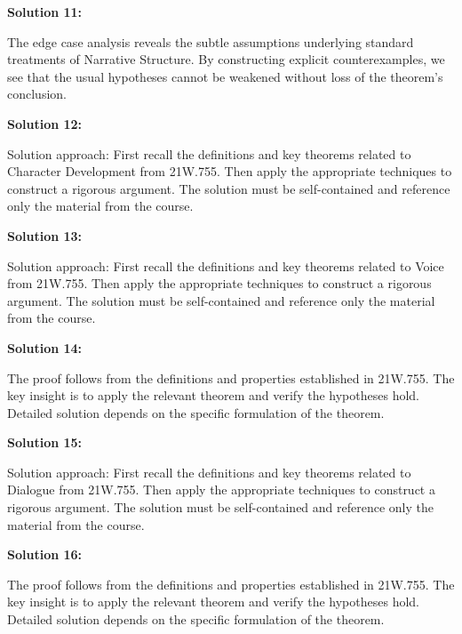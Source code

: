 \documentclass[12pt,a4paper]{exam}
\begin{document}
\textbf{Solution 11:}

The edge case analysis reveals the subtle assumptions underlying standard treatments of Narrative Structure. By constructing explicit counterexamples, we see that the usual hypotheses cannot be weakened without loss of the theorem's conclusion.

\vspace{0.5cm}

\textbf{Solution 12:}

Solution approach: First recall the definitions and key theorems related to Character Development from 21W.755. Then apply the appropriate techniques to construct a rigorous argument. The solution must be self-contained and reference only the material from the course.

\vspace{0.5cm}

\textbf{Solution 13:}

Solution approach: First recall the definitions and key theorems related to Voice from 21W.755. Then apply the appropriate techniques to construct a rigorous argument. The solution must be self-contained and reference only the material from the course.

\vspace{0.5cm}

\textbf{Solution 14:}

The proof follows from the definitions and properties established in 21W.755. The key insight is to apply the relevant theorem and verify the hypotheses hold. Detailed solution depends on the specific formulation of the theorem.

\vspace{0.5cm}

\textbf{Solution 15:}

Solution approach: First recall the definitions and key theorems related to Dialogue from 21W.755. Then apply the appropriate techniques to construct a rigorous argument. The solution must be self-contained and reference only the material from the course.

\vspace{0.5cm}

\textbf{Solution 16:}

The proof follows from the definitions and properties established in 21W.755. The key insight is to apply the relevant theorem and verify the hypotheses hold. Detailed solution depends on the specific formulation of the theorem.

\vspace{0.5cm}
\end{document}
